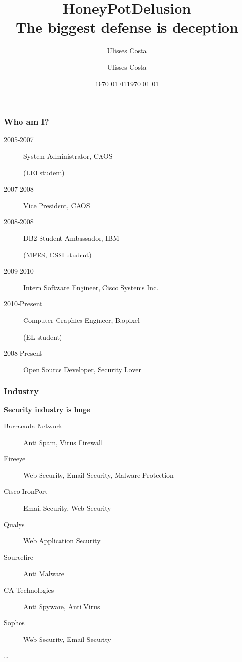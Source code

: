 \documentclass{beamer}
\title{HoneyPot}
\author{Ulisses Costa}
\date{\today}
\begin{document}
\begin{frame}
   \titlepage
\end{frame}

\title{Delusion\\
\small{The biggest defense is deception}}
\author{Ulisses Costa}
\date{\today}

\begin{frame}
   \titlepage
\end{frame}

\begin{frame}\frametitle{Who am I?}
\begin{description}
  \item[2005-2007] System Administrator, CAOS
  \item[] (LEI student)
  \item[2007-2008] Vice President, CAOS
  \item[2008-2008] DB2 Student Ambassador, IBM
  \item[] (MFES, CSSI student)
  \item[2009-2010] Intern Software Engineer, Cisco Systems Inc.
  \item[2010-Present] Computer Graphics Engineer, Biopixel
  \item[] (EL student)
  \item[2008-Present] Open Source Developer, Security Lover
\end{description}
\end{frame}

\begin{frame}\frametitle{Industry}
\begin{center}
\textbf{Security industry is huge}
\end{center}
\begin{description}
  \item[Barracuda Network] Anti Spam, Virus Firewall
  \item[Fireeye] Web Security, Email Security, Malware Protection
  \item[Cisco IronPort] Email Security, Web Security
  \item[Qualys] Web Application Security
  \item[Sourcefire] Anti Malware
  \item[CA Technologies] Anti Spyware, Anti Virus
  \item[Sophos] Web Security, Email Security
\end{description}
\ldots
\end{frame}
\end{document}
